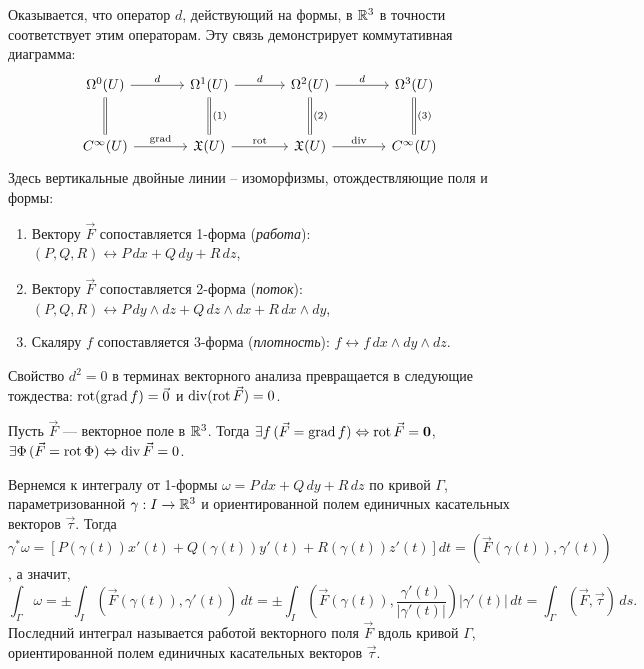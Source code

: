 Оказывается, что оператор $d$, действующий на формы, в $\mathbb{R}^3$ в точности соответствует этим операторам. Эту связь демонстрирует коммутативная диаграмма:
\[
\begin{tikzcd}[row sep=large, column sep=large]
    \Omega^0(U) \arrow[d, equal] \arrow[r, "d"] 
    & \Omega^1(U) \arrow[d, equal, "(1)"] \arrow[r, "d"] 
    & \Omega^2(U) \arrow[d, equal, "(2)"] \arrow[r, "d"] 
    & \Omega^3(U) \arrow[d, equal, "(3)"] \\
    C^\infty(U) \arrow[r, "\text{grad}"] 
    & \mathfrak{X}(U) \arrow[r, "\rot"] 
    & \mathfrak{X}(U) \arrow[r, "\operatorname{div}"] 
    & C^\infty(U)
\end{tikzcd}
\]
Здесь вертикальные двойные линии -- изоморфизмы, отождествляющие поля и формы:
\begin{enumerate}[itemsep = 0pt, topsep = 5pt]
    \item[(1)] Вектору $\vec{F}$ сопоставляется 1-форма (\textit{работа}): $(P, Q, R) \leftrightarrow P\, dx + Q\, dy + R\, dz$,
    \item[(2)] Вектору $\vec{F}$ сопоставляется 2-форма (\textit{поток}): $(P, Q, R) \leftrightarrow P\, dy \wedge dz + Q\, dz \wedge dx + R\, dx \wedge dy$,
    \item[(3)] Скаляру $f$ сопоставляется 3-форма (\textit{плотность}): $f \leftrightarrow f\, dx \wedge dy \wedge dz$.
\end{enumerate}

\begin{note}
	Свойство $d^2 = 0$ в терминах векторного анализа превращается в следующие тождества: $\operatorname{rot} (\text{grad}\, f) = \vec{0}$ и $\operatorname{div} (\operatorname{rot} \vec{F}) = 0$. 
\end{note}

\begin{note}
    Пусть $\vec{F}$ --- векторное поле в $\mathbb{R}^3$. Тогда $\exists f \, (\vec{F} = \text{grad}\, f) \Leftrightarrow \operatorname{rot} \vec{F} = \mathbf{0}$, $\exists \Phi \, (\vec{F} = \operatorname{rot} \Phi) \Leftrightarrow \operatorname{div} \vec{F} = 0$.
\end{note}


Вернемся к интегралу от 1-формы $\omega = P\, dx + Q\, dy + R\, dz$ по кривой $\Gamma$, параметризованной $\gamma: I \to \mathbb{R}^3$ и ориентированной полем единичных касательных векторов $\vec{\tau}$. Тогда $\gamma^*\omega = [P(\gamma(t))x'(t) + Q(\gamma(t))y'(t) + R(\gamma(t))z'(t)]dt = (\vec{F}(\gamma(t)), \gamma'(t))$, а значит,
\[
\int_\Gamma \omega = \pm \int_I (\vec{F}(\gamma(t)), \gamma'(t)) \, dt = \pm \int_I \left( \vec{F}(\gamma(t)), \frac{\gamma'(t)}{|\gamma'(t)|} \right) |\gamma'(t)| \, dt = \int_\Gamma (\vec{F}, \vec{\tau}) \, ds.
\]
Последний интеграл называется работой векторного поля $\vec{F}$ вдоль кривой $\Gamma$, ориентированной полем единичных касательных векторов $\vec{\tau}$.

